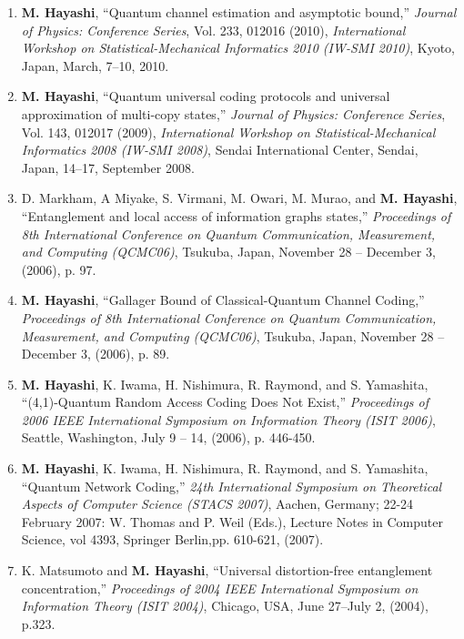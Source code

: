 \documentclass[a4paper,12pt,oneside]{article}
\begin{document}
\begin{enumerate}
    \item	\textbf{M. Hayashi}, 
    ``Quantum channel estimation and asymptotic bound,'' 
    {\em Journal of Physics: Conference Series}, Vol. 233, 012016 (2010), 
    {\em International Workshop on Statistical-Mechanical Informatics 2010 (IW-SMI 2010)}, 
    Kyoto, Japan, March, 7--10, 2010.
    
    \item	\textbf{M. Hayashi}, 
    ``Quantum universal coding protocols and universal approximation of multi-copy states,'' 
    {\em Journal of Physics: Conference Series}, Vol. 143, 012017 (2009), 
    {\em International Workshop on Statistical-Mechanical Informatics 2008 (IW-SMI 2008)}, 
    Sendai International Center, Sendai, Japan, 14--17, September 2008.
    
    \item
    D. Markham, A Miyake, S. Virmani, M. Owari, M. Murao, and \textbf{M. Hayashi},
    ``Entanglement and local access of information graphs states,''
    {\em Proceedings of 8th International Conference on Quantum 
    Communication, Measurement, and Computing (QCMC06)},
    Tsukuba, Japan, November 28 -- December 3, (2006), p. 97.
    
    \item
    \textbf{M. Hayashi},
    ``Gallager Bound of Classical-Quantum Channel Coding,''
    {\em Proceedings of 8th International Conference on Quantum 
    Communication, Measurement, and Computing (QCMC06)},
    Tsukuba, Japan, November 28 -- December 3, (2006), p. 89.
    
    \item
    \textbf{M. Hayashi}, K. Iwama, H. Nishimura, R. Raymond, and S. Yamashita, ``(4,1)-Quantum Random Access Coding Does Not Exist,'' 
    {\em Proceedings of 2006 IEEE International Symposium on Information Theory (ISIT 2006)}, 
    Seattle, Washington, July 9 -- 14, (2006), p. 446-450.
    
    \item
    \textbf{M. Hayashi}, K. Iwama, H. Nishimura, R. Raymond, and S. Yamashita, ``Quantum Network Coding,'' 
    {\em 24th International Symposium on Theoretical Aspects of Computer Science (STACS 2007)}, Aachen, Germany; 22-24 February 2007: 
    W. Thomas and P. Weil (Eds.), Lecture Notes in Computer Science, vol 4393, Springer Berlin,pp. 610-621, (2007). 
    
    \item
    K. Matsumoto and \textbf{M. Hayashi}, ``Universal distortion-free entanglement concentration,'' 
    {\em Proceedings of 2004 IEEE International Symposium on Information Theory (ISIT 2004)}, 
    Chicago, USA, June 27--July 2, (2004), p.323.
    

\end{enumerate}
\end{document}
